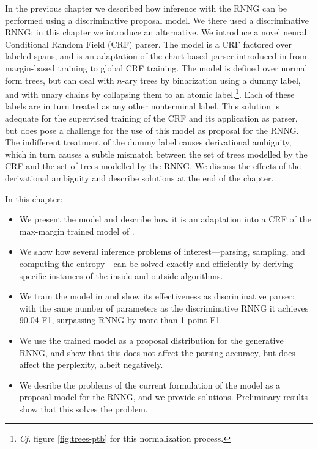 In the previous chapter we described how inference with the RNNG can be performed using a discriminative proposal model. We there used a discriminative RNNG; in this chapter we introduce an alternative. We introduce a novel neural Conditional Random Field (CRF) parser. The model is a CRF factored over labeled spans, and is an adaptation of the chart-based parser introduced in \citet{stern2017minimal} from margin-based training to global CRF training. The model is defined over normal form trees, but can deal with $n$-ary trees by binarization using a dummy label, and with unary chains by collapsing them to an atomic label.\footnote{\textit{Cf.} figure \ref{fig:trees-ptb} for this normalization process.}. Each of these labels are in turn treated as any other nonterminal label. This solution is adequate for the supervised training of the CRF and its application as parser, but does pose a challenge for the use of this model as proposal for the RNNG. The indifferent treatment of the dummy label causes derivational ambiguity, which in turn causes a subtle mismatch between the set of trees modelled by the CRF and the set of trees modelled by the RNNG. We discuss the effects of the derivational ambiguity and describe solutions at the end of the chapter.

In this chapter:
\begin{itemize}
  \item We present the model and describe how it is an adaptation into a CRF of the max-margin trained model of \citet{stern2017minimal}.
  \item We show how several inference problems of interest---parsing, sampling, and computing the entropy---can be solved exactly and efficiently by deriving specific instances of the inside and outside algorithms.
  \item We train the model in and show its effectiveness as discriminative parser: with the same number of parameters as the discriminative RNNG it achieves 90.04 F1, surpassing RNNG by more than 1 point F1.
  \item We use the trained model as a proposal distribution for the generative RNNG, and show that this does not affect the parsing accuracy, but does affect the perplexity, albeit negatively.
  \item We desribe the problems of the current formulation of the model as a proposal model for the RNNG, and we provide solutions. Preliminary results show that this solves the problem.
\end{itemize}

